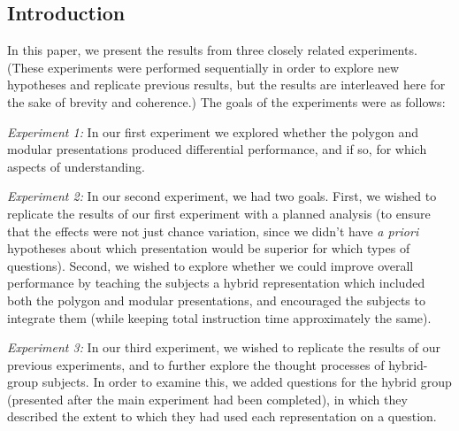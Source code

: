 \documentclass[man,10pt]{apa6}
\begin{document}
\subsection{Introduction}
In this paper, we present the results from three closely related experiments. (These experiments were performed sequentially in order to explore new hypotheses and replicate previous results, but the results are interleaved here for the sake of brevity and coherence.) The goals of the experiments were as follows: \par
\textit{Experiment 1:} In our first experiment we explored whether the polygon and modular presentations produced differential performance, and if so, for which aspects of understanding. \par
\textit{Experiment 2:} In our second experiment, we had two goals. First, we wished to replicate the results of our first experiment with a planned analysis (to ensure that the effects were not just chance variation, since we didn't have \textit{a priori} hypotheses about which presentation would be superior for which types of questions). Second, we wished to explore whether we could improve overall performance by teaching the subjects a hybrid representation which included both the polygon and modular presentations, and encouraged the subjects to integrate them (while keeping total instruction time approximately the same). \par
\textit{Experiment 3:} In our third experiment, we wished to replicate the results of our previous experiments, and to further explore the thought processes of hybrid-group subjects. In order to examine this, we added questions for the hybrid group (presented after the main experiment had been completed), in which they described the extent to which they had used each representation on a question. 
\end{document}
